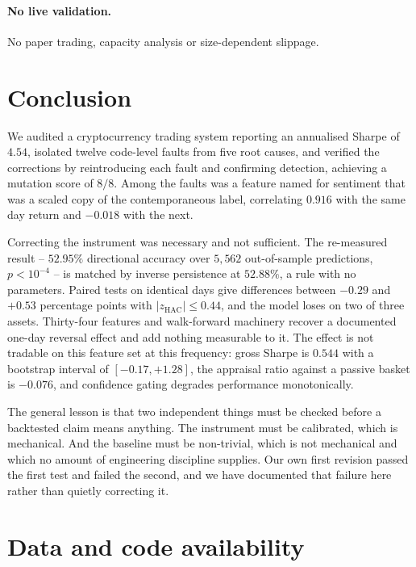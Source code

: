 \documentclass[preprint,12pt,authoryear]{elsarticle}
\begin{document}
\paragraph{No live validation.} No paper trading, capacity analysis or
size-dependent slippage.

\section{Conclusion}
\label{sec:conclusion}

We audited a cryptocurrency trading system reporting an annualised Sharpe of
$4.54$, isolated twelve code-level faults from five root causes, and verified the
corrections by reintroducing each fault and confirming detection, achieving a
mutation score of $8/8$. Among the faults was a feature named for sentiment that
was a scaled copy of the contemporaneous label, correlating $0.916$ with the same
day return and $-0.018$ with the next.

Correcting the instrument was necessary and not sufficient. The re-measured
result -- $52.95\%$ directional accuracy over $5{,}562$ out-of-sample
predictions, $p < 10^{-4}$ -- is matched by inverse persistence at $52.88\%$, a
rule with no parameters. Paired tests on identical days give differences between
$-0.29$ and $+0.53$ percentage points with $|z_{\mathrm{HAC}}| \le 0.44$, and the model loses on
two of three assets. Thirty-four features and walk-forward machinery recover a
documented one-day reversal effect and add nothing measurable to it. The effect
is not tradable on this feature set at this frequency: gross Sharpe is $0.544$
with a bootstrap interval of $[-0.17, +1.28]$, the appraisal ratio against a
passive basket is $-0.076$, and confidence gating degrades performance
monotonically.

The general lesson is that two independent things must be checked before a
backtested claim means anything. The instrument must be calibrated, which is
mechanical. And the baseline must be non-trivial, which is not mechanical and
which no amount of engineering discipline supplies. Our own first revision passed
the first test and failed the second, and we have documented that failure here
rather than quietly correcting it.

\section*{Data and code availability}
\end{document}
